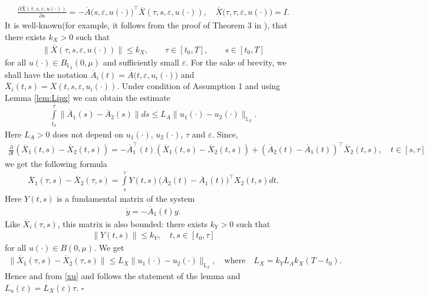 \documentclass[../main.tex]{subfiles}
\begin{document}
\begin{gather*}
	\frac{\partial \overline{X}(\tau,s,\varepsilon,u(\cdot))}{\partial s} = -\overline{A}\big(s,\varepsilon,u(\cdot)\big)^{\top} \overline{X}(\tau,s,\varepsilon,u(\cdot)), \quad \overline{X}\big(\tau,\tau,\varepsilon,u(\cdot)\big) = I.
\end{gather*}
It is well-known(for example, it follows from the proof of Theorem 3 in \cite{Fillipov}), that there exists  $k_X>0$ such that
\begin{gather*}
	\| \overline{X}(\tau,s,\varepsilon,u(\cdot)) \| \leqslant k_X, \qquad \tau \in [t_0,T], \qquad s \in [t_0,T]
\end{gather*}
for all $u(\cdot) \in B_{\mathbb{L}_2}(0,\mu)$ and sufficiently small $\varepsilon $. For the sake of brevity, we shall have the notation $\overline{A}_i(t) = \overline{A}\big(t,\varepsilon,u_i(\cdot)\big) $  and $ \overline{X}_i(t,s) = \overline{X}(t,s,\varepsilon,u_i(\cdot))$. Under condition of Assumption 1 and using Lemma \ref{lem:Lipx} we can obtain the estimate
\begin{gather*}
	\int\limits_{t_0}^{\tau} \|\overline{A}_1(s) - \overline{A}_2(s) \| ds \leqslant L_A \| u_1(\cdot) - u_2(\cdot) \|_{\mathbb{L}_2}. 
\end{gather*}
Here $L_A>0$ does not depend on $u_1(\cdot)$, $u_2(\cdot)$, $\tau$ and $\varepsilon$. Since,
\begin{gather*}
	\frac{\partial}{\partial t} \left(\overline{X}_1(t,s) - \overline{X}_2(t,s) \right) = -\overline{A}_1^{\top}(t) \left(\overline{X}_1(t,s) - \overline{X}_2(t,s) \right) + (\overline{A}_2(t) - \overline{A}_1(t))^{\top} \overline{X}_2(t,s), \quad t \in [s,\tau]
\end{gather*}
we get the following formula
\begin{gather*}
	\overline{X}_1(\tau,s) - \overline{X}_2(\tau,s) = \int\limits_s^{\tau} Y(t,s) \big(\overline{A}_2(t) - \overline{A}_1(t)\big)^{\top} X_2(t,s) dt.
\end{gather*}
Here $Y(t,s)$ is a fundamental matrix of the system
\begin{gather*}
	\dot{y} = -\overline{A}_1(t) y.
\end{gather*}
Like $\overline{X}_i(\tau,s)$, this matrix is also bounded: there exists  $k_Y>0$ such that
\begin{gather*}
	\|Y(t,s)\| \leqslant k_Y, \quad t,s \in [t_0, \tau]
\end{gather*}
for all $u(\cdot) \in B(0,\mu)$. We get
\begin{gather*}
	\| \overline{X}_1(\tau,s) - \overline{X}_2(\tau,s) \| \leqslant L_X \| u_1(\cdot) - u_2(\cdot) \|_{\mathbb{L}_2}, \quad \mbox{where} \quad L_X = k_Y L_A k_X (T - t_0) .
\end{gather*}
Hence and from \eqref{xu} and follows the statement of the lemma and $L_u(\varepsilon) = L_X(\varepsilon)\tau $.
\hfill$\square$\\[1ex]%
\end{document}
